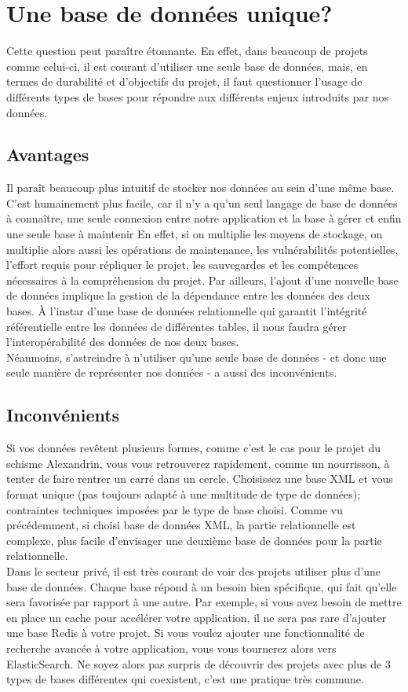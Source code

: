     \section{Une base de données unique?}

Cette question peut paraître étonnante. En effet, dans beaucoup de projets comme celui-ci, il est courant d’utiliser une seule base de données, mais, en termes de durabilité et d’objectifs du projet, il faut questionner l’usage de différents types de bases pour répondre aux différents enjeux introduits par nos données. 


    \subsection{Avantages}

Il paraît beaucoup plus intuitif de stocker nos données au sein d'une même base. C’est humainement plus facile, car il n’y a qu’un seul langage de base de données à connaître, une seule connexion entre notre application et la base à gérer et enfin une seule base à maintenir  En effet, si on multiplie les moyens de stockage, on multiplie alors aussi les opérations de maintenance, les vulnérabilités potentielles, l’effort requis pour répliquer le projet, les sauvegardes et les compétences nécessaires à la compréhension du projet. 
Par ailleurs, l’ajout d’une nouvelle base de données implique la gestion de la dépendance entre les données des deux bases. À l’instar d’une base de données relationnelle qui garantit l’intégrité référentielle entre les données de différentes tables, il nous faudra gérer l’interopérabilité des données de nos deux bases.\\
Néanmoins, s’astreindre à n’utiliser qu’une seule base de données - et donc une seule manière de représenter nos données - a aussi des inconvénients.
    
    \subsection{Inconvénients}

Si vos données revêtent plusieurs formes, comme c’est le cas pour le projet du schisme Alexandrin, vous vous retrouverez rapidement, comme un nourrisson, à tenter de faire rentrer un carré dans un cercle. Choisissez une base XML et vous 
format unique (pas toujours adapté à une multitude de type de données); contraintes techniques imposées par le type de base choisi. Comme vu précédemment, si choisi base de données XML, la partie relationnelle est complexe, plus facile d’envisager une deuxième base de données pour la partie relationnelle.\\ 
Dans le secteur privé, il est très courant de voir des projets utiliser plus d’une base de données. Chaque base répond à un besoin bien spécifique, qui fait qu’elle sera favorisée par rapport à une autre. Par exemple, si vous avez besoin de mettre en place un cache pour accélérer votre application, il ne sera pas rare d’ajouter une base Redis à votre projet. Si vous voulez ajouter une fonctionnalité de recherche avancée à votre application, vous vous tournerez alors vers ElasticSearch. Ne soyez alors pas surpris de découvrir des projets avec plus de 3 types de bases différentes qui coexistent, c’est une pratique très commune. 
